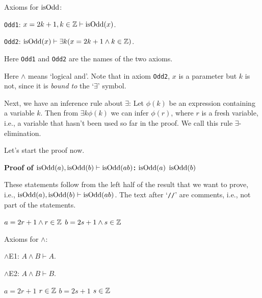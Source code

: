 Axioms for $\operatorname{isOdd}$:
\begin{tightemize}
\item \texttt{Odd1}: $x = 2k+1, k \in \mathbb{Z} \vdash \operatorname{isOdd}(x)$.
\item \texttt{Odd2}: $\operatorname{isOdd}(x) \vdash \exists k (x = 2k+1 \land k \in \mathbb{Z})$.
\end{tightemize}
Here \texttt{Odd1} and \texttt{Odd2} are the names of the two axioms.

Here $\land$ means `logical and'.
Note that in axiom \texttt{Odd2}, $x$ is a parameter but $k$ is not,
since it is \emph{bound to} the `$\exists$' symbol.

Next, we have an inference rule about $\exists$:
Let $\phi(k)$ be an expression containing a variable $k$.
Then from $\exists k \phi(k)$ we can infer $\phi(r)$,
where $r$ is a fresh variable, i.e., a variable that hasn't been used so far in the proof.
We call this rule $\exists$-elimination.

Let's start the proof now.

\begin{formalproof}
\Statex \textbf{Proof of $\operatorname{isOdd}(a), \operatorname{isOdd}(b) \vdash \operatorname{isOdd}(ab)$:}
\State \label{p1:given1}$\operatorname{isOdd}(a)$ 
\State \label{p1:given2}$\operatorname{isOdd}(b)$ 
\end{formalproof}

These statements follow from the left half of the result that we want to prove,
i.e., $\operatorname{isOdd}(a), \operatorname{isOdd}(b) \vdash \operatorname{isOdd}(ab)$.
The text after `\texttt{//}' are comments, i.e., not part of the statements.

\begin{formalproof}
\State \label{p1:oddEla}$a = 2r + 1 \land r \in \mathbb{Z}$
\State \label{p1:oddElb}$b = 2s + 1 \land s \in \mathbb{Z}$
\end{formalproof}

Axioms for $\land$:
\begin{tightemize}
\item $\land$E1: $A \land B \vdash A$.
\item $\land$E2: $A \land B \vdash B$.
\end{tightemize}

\begin{formalproof}
\State \label{p1:aeq2rp1}$a = 2r + 1$
\State \label{p1:rinZ}$r \in \mathbb{Z}$
\State \label{p1:beq2sp1}$b = 2s + 1$
\State \label{p1:sinZ}$s \in \mathbb{Z}$
\end{formalproof}

